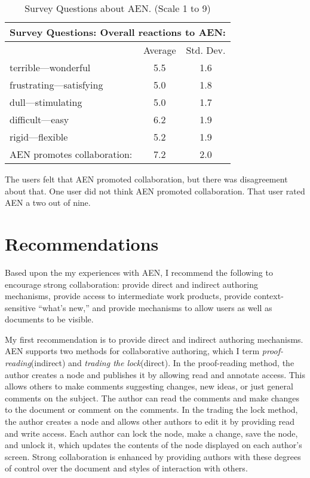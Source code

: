 \small
\begin{table}[htb]
  \caption{Survey Questions about AEN. (Scale 1 to 9)}
  \begin{center}
    \begin{tabular}{|l|c|c|}
      \hline
      \multicolumn{3}{|c|}{\rule[-3mm]{0mm}{8mm}\bf Survey Questions:
      Overall reactions to AEN:}\\ \hline
      &Average&Std. Dev.\\ \hline
      terrible---wonderful&5.5&1.6\\\hline
      frustrating---satisfying&5.0&1.8\\\hline
      dull---stimulating&5.0&1.7\\\hline
      difficult---easy&6.2&1.9\\\hline
      rigid---flexible&5.2&1.9\\\hline\hline
      AEN promotes collaboration:&7.2&2.0\\\hline
    \end{tabular}
  \end{center}
  \label{tab:survey-AEN}
\end{table}
\normalsize

The users felt that AEN promoted collaboration, but there was disagreement
about that.  One user did not think AEN promoted collaboration.  That user
rated AEN a two out of nine.


\section{Recommendations}
\label{sec:conclusions}


Based upon the my experiences with AEN, I recommend the following to
encourage strong collaboration: provide direct and indirect authoring
mechanisms, provide access to intermediate work products, provide
context-sensitive ``what's new,'' and provide mechanisms to allow users as
well as documents to be visible.

My first recommendation is to provide direct and indirect authoring
mechanisms.  AEN supports two methods for collaborative authoring, which I
term {\em proof-reading}(indirect) and {\em trading the lock}(direct).  In
the proof-reading method, the author creates a node and publishes it by
allowing read and annotate access.  This allows others to make comments
suggesting changes, new ideas, or just general comments on the subject.
The author can read the comments and make changes to the document or
comment on the comments.  In the trading the lock method, the author
creates a node and allows other authors to edit it by providing read and
write access.  Each author can lock the node, make a change, save the node,
and unlock it, which updates the contents of the node displayed on each
author's screen.  Strong collaboration is enhanced by providing authors
with these degrees of control over the document and styles of interaction
with others.

